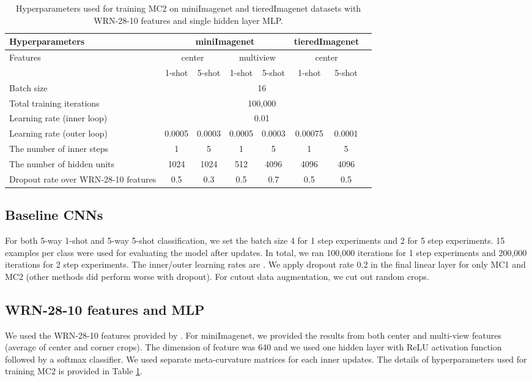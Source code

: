 \documentclass{article}
\begin{document}
\begin{table}[t]
\caption{Hyperparameters used for training MC2 on miniImagenet and tieredImagenet datasets with WRN-28-10 features and single hidden layer MLP.}
\label{table:miniimagenet_wrn_hyper}
\begin{center}
\begin{small}
\begin{tabular}{lccccccc}
\toprule
Hyperparameters & \multicolumn{4}{c}{miniImagenet} & \multicolumn{2}{c}{tieredImagenet} \\
\midrule
Features & \multicolumn{2}{c}{center} & \multicolumn{2}{c}{multiview} & \multicolumn{2}{c}{center} \\
& 1-shot & 5-shot & 1-shot & 5-shot & 1-shot & 5-shot \\
\midrule
Batch size & \multicolumn{6}{c}{16} \\
Total training iterations & \multicolumn{6}{c}{100,000} \\
Learning rate (inner loop) & \multicolumn{6}{c}{0.01} \\
\midrule
Learning rate (outer loop) & 0.0005 & 0.0003 & 0.0005 & 0.0003 & 0.00075 & 0.0001 \\
The number of inner steps  & 1 & 5 & 1 & 5 & 1 & 5 \\
The number of hidden units  & 1024 & 1024 & 512 & 4096 & 4096 & 4096 \\
Dropout rate over WRN-28-10 features & 0.5 & 0.3 & 0.5 & 0.7 & 0.5 & 0.5 \\
\bottomrule
\end{tabular}
\end{small}
\end{center}
\end{table}

\subsection{Baseline CNNs} For both 5-way 1-shot and 5-way 5-shot classification, we set the batch size 4 for 1 step experiments and 2 for 5 step experiments. 15 examples per class were used for evaluating the model after updates. In total, we ran 100,000 iterations for 1 step experiments and 200,000 iterations for 2 step experiments. The inner/outer learning rates are . We apply dropout rate 0.2 in the final linear layer for only MC1 and MC2 (other methods did perform worse with dropout). For cutout data augmentation, we cut out  random crops.

\subsection{WRN-28-10 features and MLP} We used the WRN-28-10 features provided by \cite{rusu-iclr19}. For miniImagenet, we provided the results from both center and multi-view features (average of center and corner crops). The dimension of feature was 640 and we used one hidden layer with ReLU activation function followed by a softmax classifier. We used separate meta-curvature matrices for each inner updates. The details of hyperparameters used for training MC2 is provided in Table \ref{table:miniimagenet_wrn_hyper}.
\end{document}
